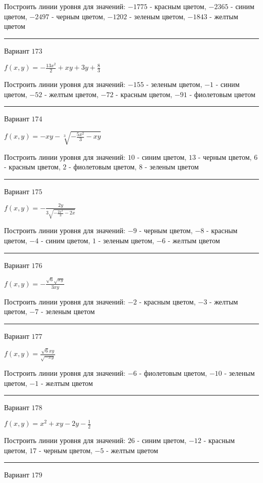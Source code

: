 \documentclass[11pt]{report}
\begin{document}
Построить линии уровня для значений: $-1775$ - красным цветом, $-2365$ - синим цветом, $-2497$ - черным цветом, $-1202$ - зеленым цветом, $-1843$ - желтым цветом
\begin{center}
\noindent\rule{8cm}{0.4pt}
\end{center}
Вариант $173$


$f(x, y) = - \frac{13 x^{2}}{2} + x y + 3 y + \frac{8}{3}$

Построить линии уровня для значений: $-155$ - зеленым цветом, $-1$ - синим цветом, $-52$ - желтым цветом, $-72$ - красным цветом, $-91$ - фиолетовым цветом
\begin{center}
\noindent\rule{8cm}{0.4pt}
\end{center}
Вариант $174$


$f(x, y) = - x y - \sqrt[3]{- \frac{5 x^{2}}{3} - x y}$

Построить линии уровня для значений: $10$ - синим цветом, $13$ - черным цветом, $6$ - красным цветом, $2$ - фиолетовым цветом, $8$ - зеленым цветом
\begin{center}
\noindent\rule{8cm}{0.4pt}
\end{center}
Вариант $175$


$f(x, y) = - \frac{2 y}{3 \sqrt{- \frac{2 x^{2}}{3} - 2 x}}$

Построить линии уровня для значений: $-9$ - черным цветом, $-8$ - красным цветом, $-4$ - синим цветом, $1$ - зеленым цветом, $-6$ - желтым цветом
\begin{center}
\noindent\rule{8cm}{0.4pt}
\end{center}
Вариант $176$


$f(x, y) = - \frac{\sqrt{6} \sqrt{x y}}{3 x y}$

Построить линии уровня для значений: $-2$ - красным цветом, $-3$ - желтым цветом, $-7$ - зеленым цветом
\begin{center}
\noindent\rule{8cm}{0.4pt}
\end{center}
Вариант $177$


$f(x, y) = \frac{\sqrt{6} x y}{\sqrt{- x y}}$

Построить линии уровня для значений: $-6$ - фиолетовым цветом, $-10$ - зеленым цветом, $-1$ - желтым цветом
\begin{center}
\noindent\rule{8cm}{0.4pt}
\end{center}
Вариант $178$


$f(x, y) = x^{2} + x y - 2 y - \frac{1}{2}$

Построить линии уровня для значений: $26$ - синим цветом, $-12$ - красным цветом, $17$ - черным цветом, $-5$ - желтым цветом
\begin{center}
\noindent\rule{8cm}{0.4pt}
\end{center}
Вариант $179$
\end{document}

